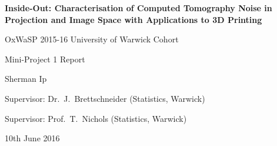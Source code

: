 \documentclass[12pt]{report}
\begin{document}
\begin{titlepage}
\centering
\vspace*{1cm}
        
        \LARGE
        \textbf{Inside-Out: Characterisation of Computed Tomography Noise in Projection and Image Space with Applications to 3D Printing}
        
		\large        
        
        \vspace{2cm}
        {OxWaSP 2015-16 University of Warwick Cohort}
        
        \vspace{1cm}
        {Mini-Project 1 Report}
        
        \vspace{1cm}
        {Sherman Ip}

        \vspace{1cm}
        {Supervisor: Dr.~J.~Brettschneider (Statistics, Warwick)}
        
        \vspace{1cm}
        {Supervisor: Prof.~T.~Nichols (Statistics, Warwick)}
        
        \vspace{1cm}
        {10th June 2016}
\end{titlepage}

\begin{abstract}
X-ray computed tomography can be used to do quality control on 3D printed samples. However there are sources of error in the 3D printing, how the photons behave and in the X-ray detector. This project aims to find a relationship between the sample mean and sample variance grey values in images obtained from the X-ray detector by fitting linear regressions. In addition, latent variable models such as principle component analysis, factor analysis and the compound Poisson were attempted to be fitted to find sources of variance.
\end{abstract}

\renewcommand{\abstractname}{Acknowledgements}
\begin{abstract}
\begin{itemize}
	\item Supervisors: Julia Brettschneider and Tom Nichols
	\item Inside Out Team: Wilfrid Kendall, Audrey Kueh, Jay Warnett and Clair Barnes
	\item OxWaSP 2015 Cohort: Nathan Cunningham, Giuseppe di Benedetto, Beniamino Hadj-Amar, Jack Jewson, Ella Kaye, Leon Law, Kaspar Martens, Marcin Mider, Xenia Miscouridou, Paul Vanetti and Andi Wang.
	\item EPSRC Funding: EP/L016710/1
\end{itemize}
\end{abstract}
\end{document}
